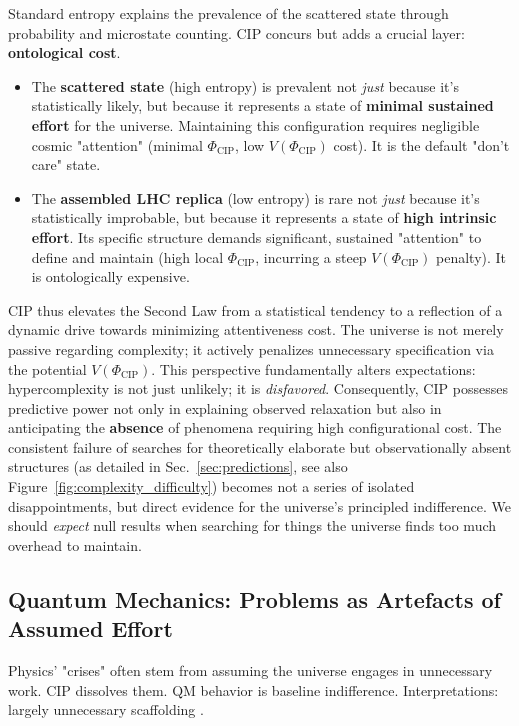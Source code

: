 \documentclass[11pt, a4paper]{article}
\newcommand{\subt}[1]{\mathrm{#1}}
\begin{document}
Standard entropy explains the prevalence of the scattered state through probability and microstate counting. CIP concurs but adds a crucial layer: \textbf{ontological cost}.
\begin{itemize}
    \item The \textbf{scattered state} (high entropy) is prevalent not \textit{just} because it's statistically likely, but because it represents a state of \textbf{minimal sustained effort} for the universe. Maintaining this configuration requires negligible cosmic "attention" (minimal $\Phi_{\subt{CIP}}$, low $V(\Phi_{\subt{CIP}})$ cost). It is the default "don't care" state.
    \item The \textbf{assembled LHC replica} (low entropy) is rare not \textit{just} because it's statistically improbable, but because it represents a state of \textbf{high intrinsic effort}. Its specific structure demands significant, sustained "attention" to define and maintain (high local $\Phi_{\subt{CIP}}$, incurring a steep $V(\Phi_{\subt{CIP}})$ penalty). It is ontologically expensive.
\end{itemize}

CIP thus elevates the Second Law from a statistical tendency to a reflection of a dynamic drive towards minimizing attentiveness cost. The universe is not merely passive regarding complexity; it actively penalizes unnecessary specification via the potential $V(\Phi_{\subt{CIP}})$. This perspective fundamentally alters expectations: hypercomplexity is not just unlikely; it is \textit{disfavored}. Consequently, CIP possesses predictive power not only in explaining observed relaxation but also in anticipating the \textbf{absence} of phenomena requiring high configurational cost. The consistent failure of searches for theoretically elaborate but observationally absent structures (as detailed in Sec.~\ref{sec:predictions}, see also Figure~\ref{fig:complexity_difficulty}) becomes not a series of isolated disappointments, but direct evidence for the universe's principled indifference. We should \textit{expect} null results when searching for things the universe finds too much overhead to maintain.

\subsection{Quantum Mechanics: Problems as Artefacts of Assumed Effort}

Physics' "crises" often stem from assuming the universe engages in unnecessary work. CIP dissolves them. QM behavior is baseline indifference. Interpretations: largely unnecessary scaffolding \cite{PenroseComplexity}.
\end{document}
